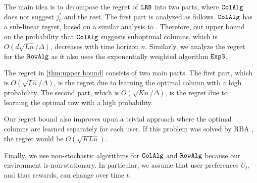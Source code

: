 \begin{discussion}
The main idea is to decompose the regret of ${\tt LRB}$ into two parts, where ${\tt ColAlg}$ does not suggest $j^*_t$ and the rest. The first part is analyzed as follows. ${\tt ColAlg}$ has a sub-linear regret, based on a similar analysis to \citet{auer2002nonstochastic}. Therefore, our upper bound on the probability  that ${\tt ColAlg}$ suggests suboptimal columns, which is $O(d \sqrt{L n} / \Delta)$, decreases with time horizon $n$. Similarly, we analyze the regret for the ${\tt RowAlg}$ as it also uses the exponentially weighted algorithm ${\tt Exp3}$.


The regret in \cref{thm:upper bound} consists of two main parts. The first part, which is $O(\sqrt{L n} / \Delta)$, is the regret due to learning the optimal column with a high probability.  The second part, which is $O(\sqrt{K n} / \Delta)$, is the regret due to learning the optimal row with a high probability. 

Our regret bound also improves upon a trivial approach where the optimal columns are learned separately for each user. If this problem was solved by RBA \citep{radlinski2008learning}, the regret would be $O(\sqrt{K L n})$. 

Finally, we use non-stochastic algorithms for ${\tt ColAlg}$ and ${\tt RowAlg}$ because our environment is non-stationary. In particular, we assume that user preferences $U_t$, and thus rewards, can change over time $t$. 
\end{discussion}